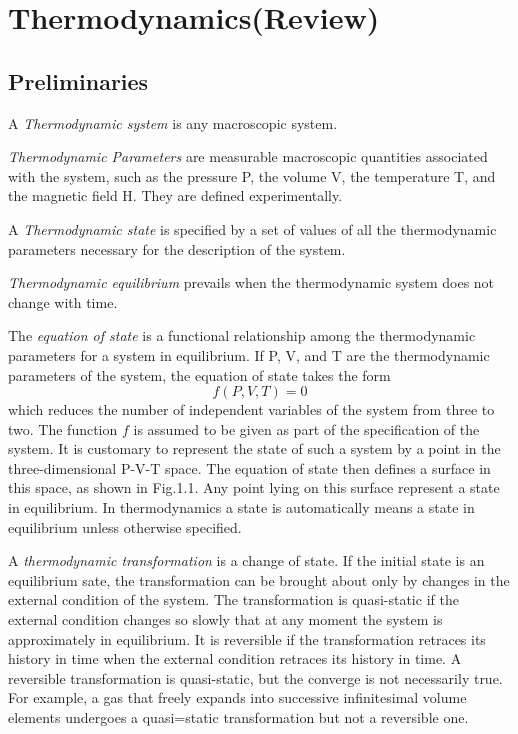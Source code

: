 \chapter{Thermodynamics(Review)}
\section{Preliminaries}
\begin{definition}
    A \emph{Thermodynamic system} is any macroscopic system.
\end{definition}
\begin{definition}
    \emph{Thermodynamic Parameters} are measurable macroscopic quantities associated with the system, such as the pressure P, the volume V, the temperature T, and the magnetic field H. They are defined experimentally.
\end{definition}
\begin{definition} 
    A \emph{Thermodynamic state} is specified by a set of values of all the thermodynamic parameters necessary for the description of the system.
\end{definition}   
\begin{definition}
    \emph{Thermodynamic equilibrium} prevails when the thermodynamic system does not change with time.
\end{definition}
\begin{definition}
    The \emph{equation of state} is a functional relationship among the thermodynamic parameters for a system in equilibrium. If P, V, and T are the thermodynamic parameters of the system, the equation of state takes the form 
    \[
        f(P,V,T) = 0
    \]
    which reduces the number of independent variables of the system from three to two. The function \(f\) is assumed to be given as part of the specification of the system. It is customary to represent the state of such a system by a point in the three-dimensional P-V-T space. The equation of state then defines a surface in this space, as shown in Fig.1.1. Any point lying on this surface represent a state in equilibrium. In thermodynamics a state is automatically means a state in equilibrium unless otherwise specified. 
\end{definition}   
\begin{definition}
    A \emph{thermodynamic transformation} is a change of state. If the initial state is an equilibrium sate, the transformation can be brought about only by changes in the external condition of the system. The transformation is quasi-static if the external condition changes so slowly that at any moment the system is approximately in equilibrium. It is reversible if the transformation retraces its history in time when the external condition retraces its history in time. A reversible transformation is quasi-static, but the converge is not necessarily true. For example, a gas that freely expands into successive infinitesimal volume elements undergoes a quasi=static transformation but not a reversible one.
\end{definition}
